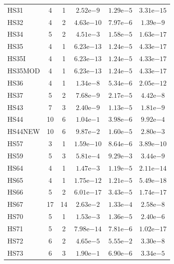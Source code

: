 \documentclass[11pt]{article}
\begin{document}
\begin{center}
\begin{longtable}{lccccc}
HS31 & 4 & 1 & $2.52\mathrm{e}{-9}$ & $1.29\mathrm{e}{-5}$ & $3.31\mathrm{e}{-15}$ \\
HS32 & 4 & 2 & $4.63\mathrm{e}{-10}$ & $7.97\mathrm{e}{-6}$ & $1.39\mathrm{e}{-9}$ \\
HS34 & 5 & 2 & $4.51\mathrm{e}{-3}$ & $1.58\mathrm{e}{-5}$ & $1.63\mathrm{e}{-17}$ \\
HS35 & 4 & 1 & $6.23\mathrm{e}{-13}$ & $1.24\mathrm{e}{-5}$ & $4.33\mathrm{e}{-17}$ \\
HS35I & 4 & 1 & $6.23\mathrm{e}{-13}$ & $1.24\mathrm{e}{-5}$ & $4.33\mathrm{e}{-17}$ \\
HS35MOD & 4 & 1 & $6.23\mathrm{e}{-13}$ & $1.24\mathrm{e}{-5}$ & $4.33\mathrm{e}{-17}$ \\
HS36 & 4 & 1 & $1.34\mathrm{e}{-8}$ & $5.34\mathrm{e}{-6}$ & $2.05\mathrm{e}{-12}$ \\
HS37 & 5 & 2 & $7.68\mathrm{e}{-9}$ & $2.17\mathrm{e}{-5}$ & $4.42\mathrm{e}{-8}$ \\
HS43 & 7 & 3 & $2.40\mathrm{e}{-9}$ & $1.13\mathrm{e}{-5}$ & $1.81\mathrm{e}{-9}$ \\
HS44 & 10 & 6 & $1.04\mathrm{e}{-1}$ & $3.98\mathrm{e}{-6}$ & $9.92\mathrm{e}{-4}$ \\
HS44NEW & 10 & 6 & $9.87\mathrm{e}{-2}$ & $1.60\mathrm{e}{-5}$ & $2.80\mathrm{e}{-3}$ \\
HS57 & 3 & 1 & $1.59\mathrm{e}{-10}$ & $8.64\mathrm{e}{-6}$ & $3.89\mathrm{e}{-10}$ \\
HS59 & 5 & 3 & $5.81\mathrm{e}{-4}$ & $9.29\mathrm{e}{-3}$ & $3.44\mathrm{e}{-9}$ \\
HS64 & 4 & 1 & $1.47\mathrm{e}{-3}$ & $1.19\mathrm{e}{-5}$ & $2.11\mathrm{e}{-14}$ \\
HS65 & 4 & 1 & $1.75\mathrm{e}{-12}$ & $1.21\mathrm{e}{-5}$ & $5.49\mathrm{e}{-18}$ \\
HS66 & 5 & 2 & $6.01\mathrm{e}{-17}$ & $3.43\mathrm{e}{-5}$ & $1.74\mathrm{e}{-17}$ \\
HS67 & 17 & 14 & $2.63\mathrm{e}{-2}$ & $1.33\mathrm{e}{-4}$ & $2.58\mathrm{e}{-8}$ \\
HS70 & 5 & 1 & $1.53\mathrm{e}{-3}$ & $1.36\mathrm{e}{-5}$ & $2.40\mathrm{e}{-6}$ \\
HS71 & 5 & 2 & $7.98\mathrm{e}{-14}$ & $7.81\mathrm{e}{-6}$ & $1.02\mathrm{e}{-17}$ \\
HS72 & 6 & 2 & $4.65\mathrm{e}{-5}$ & $5.55\mathrm{e}{-2}$ & $3.30\mathrm{e}{-8}$ \\
HS73 & 6 & 3 & $1.90\mathrm{e}{-1}$ & $6.90\mathrm{e}{-6}$ & $3.34\mathrm{e}{-5}$ \\

\end{longtable}
\end{center}
\end{document}
